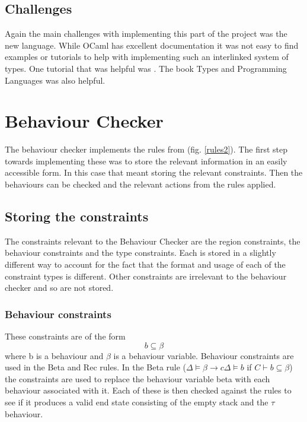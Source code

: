 \subsection{Challenges}

Again the main challenges with implementing this part of the project was the new language. While OCaml has excellent documentation it was not easy to find examples or tutorials to help with implementing such an interlinked system of types. One tutorial that was helpful was \cite{userTypes}. The book Types and Programming Languages \cite{typesprogLang} was also helpful.

\section{Behaviour Checker} \label{checker}

The behaviour checker implements the rules from (fig. \ref{rules2}). The first step towards implementing these was to store the relevant information in an easily accessible form. In this case that meant storing the relevant constraints. Then the behaviours can be checked and the relevant actions from the rules applied. 

\subsection{Storing the constraints}
\label{secConStore}

The constraints relevant to the Behaviour Checker are the region constraints, the behaviour constraints and the type constraints. Each is stored in a slightly different way to account for the fact that the format and usage of each of the constraint types is different. Other constraints are irrelevant to the behaviour checker and so are not stored. 

\subsubsection{Behaviour constraints}

These constraints are of the form $$b \subseteq \beta$$ where b is a behaviour and $\beta$ is a behaviour variable. Behaviour constraints are used in the Beta and Rec rules. In the Beta rule ($\Delta \models \beta \rightarrow c \Delta \models b$ if $C \vdash b \subseteq \beta$) the constraints are used to replace the behaviour variable beta with each behaviour associated with it. Each of these is then checked against the rules to see if it produces a valid end state consisting of the empty stack and the $\tau$ behaviour.  

